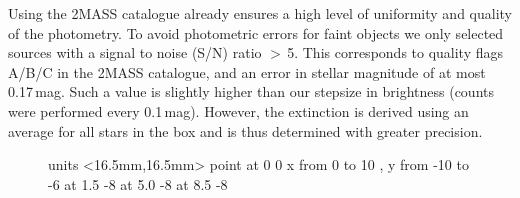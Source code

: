 \documentclass{aa}
\begin{document}
Using the 2MASS catalogue already ensures a high level of uniformity and
quality of the photometry. To avoid photometric errors for faint objects we
only selected sources with a signal to noise (S/N) ratio $>$\,5. This
corresponds to quality flags A/B/C in the 2MASS catalogue, and an error in
stellar magnitude of at most 0.17\,mag. Such a value is slightly higher than
our stepsize in brightness (counts were performed every 0.1\,mag). However, the
extinction is derived using an average for all stars in the box and is thus
determined with greater precision.  

\begin{figure}[t]
\beginpicture
\setcoordinatesystem units <16.5mm,16.5mm> point at 0 0
\setplotarea x from 0 to 10 , y from -10 to -6
 at 1.5 -8
 at 5.0 -8
 at 8.5 -8

\end{figure}
\end{document}
